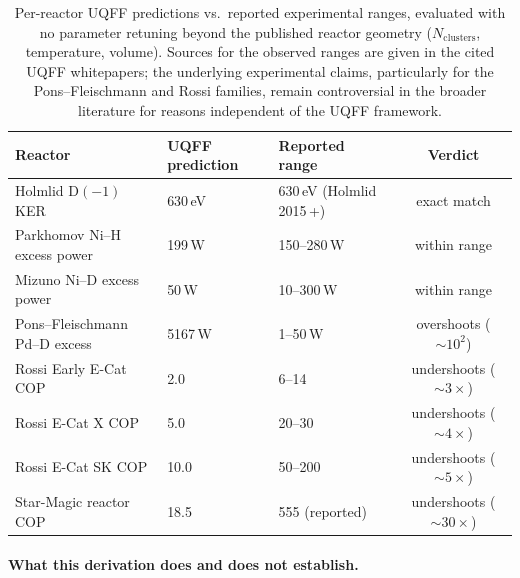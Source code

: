 \begin{table}[H]
\centering
\caption{Per-reactor UQFF predictions vs.\ reported experimental
ranges, evaluated with no parameter retuning beyond the published
reactor geometry ($N_{\text{clusters}}$, temperature, volume). Sources
for the observed ranges are given in the cited UQFF whitepapers; the
underlying experimental claims, particularly for the Pons--Fleischmann
and Rossi families, remain controversial in the broader literature
\cite{Huizenga1993, ParkPLM2000} for reasons independent of the
UQFF framework.}
\label{tab:lenr_reactors}
\begin{tabular}{l l l c}
\toprule
\textbf{Reactor} & \textbf{UQFF prediction} & \textbf{Reported range} & \textbf{Verdict} \\
\midrule
Holmlid $\mathrm{D}(-1)$ KER & 630\,eV & 630\,eV (Holmlid 2015\,+) & exact match \\
Parkhomov Ni--H excess power & 199\,W & 150--280\,W & within range \\
Mizuno Ni--D excess power & 50\,W & 10--300\,W & within range \\
Pons--Fleischmann Pd--D excess & 5167\,W & 1--50\,W & overshoots (\(\sim10^2\)) \\
Rossi Early E-Cat COP & 2.0 & 6--14 & undershoots (\(\sim3\times\)) \\
Rossi E-Cat X COP & 5.0 & 20--30 & undershoots (\(\sim4\times\)) \\
Rossi E-Cat SK COP & 10.0 & 50--200 & undershoots (\(\sim5\times\)) \\
Star-Magic reactor COP & 18.5 & 555 (reported) & undershoots (\(\sim30\times\)) \\
\bottomrule
\end{tabular}
\end{table}

\paragraph{What this derivation does and does not establish.}

